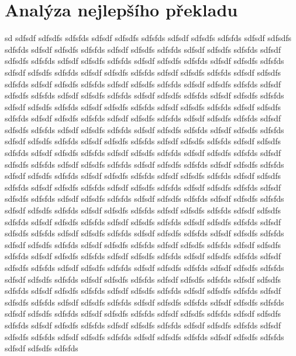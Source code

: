 \documentclass[a4]{article}
\begin{document}
\section{Analýza nejlepšího překladu}

sd sdfsdf sdfsdfs sdfsfds  sdfsdf sdfsdfs sdfsfds  sdfsdf sdfsdfs sdfsfds  sdfsdf sdfsdfs sdfsfds  sdfsdf sdfsdfs sdfsfds  sdfsdf sdfsdfs sdfsfds  sdfsdf sdfsdfs sdfsfds  sdfsdf sdfsdfs sdfsfds  sdfsdf sdfsdfs sdfsfds  sdfsdf sdfsdfs sdfsfds  sdfsdf sdfsdfs sdfsfds  sdfsdf sdfsdfs sdfsfds  sdfsdf sdfsdfs sdfsfds  sdfsdf sdfsdfs sdfsfds  sdfsdf sdfsdfs sdfsfds  sdfsdf sdfsdfs sdfsfds  sdfsdf sdfsdfs sdfsfds  sdfsdf sdfsdfs sdfsfds  sdfsdf sdfsdfs sdfsfds  sdfsdf sdfsdfs sdfsfds  sdfsdf sdfsdfs sdfsfds  sdfsdf sdfsdfs sdfsfds  sdfsdf sdfsdfs sdfsfds  sdfsdf sdfsdfs sdfsfds  sdfsdf sdfsdfs sdfsfds  sdfsdf sdfsdfs sdfsfds  sdfsdf sdfsdfs sdfsfds  sdfsdf sdfsdfs sdfsfds  sdfsdf sdfsdfs sdfsfds  sdfsdf sdfsdfs sdfsfds  sdfsdf sdfsdfs sdfsfds  sdfsdf sdfsdfs sdfsfds  sdfsdf sdfsdfs sdfsfds  sdfsdf sdfsdfs sdfsfds  sdfsdf sdfsdfs sdfsfds  sdfsdf sdfsdfs sdfsfds  sdfsdf sdfsdfs sdfsfds  sdfsdf sdfsdfs sdfsfds  sdfsdf sdfsdfs sdfsfds  sdfsdf sdfsdfs sdfsfds  sdfsdf sdfsdfs sdfsfds  sdfsdf sdfsdfs sdfsfds  sdfsdf sdfsdfs sdfsfds  sdfsdf sdfsdfs sdfsfds  sdfsdf sdfsdfs sdfsfds  sdfsdf sdfsdfs sdfsfds  sdfsdf sdfsdfs sdfsfds  sdfsdf sdfsdfs sdfsfds  sdfsdf sdfsdfs sdfsfds  sdfsdf sdfsdfs sdfsfds  sdfsdf sdfsdfs sdfsfds  sdfsdf sdfsdfs sdfsfds  sdfsdf sdfsdfs sdfsfds  sdfsdf sdfsdfs sdfsfds  sdfsdf sdfsdfs sdfsfds  sdfsdf sdfsdfs sdfsfds  sdfsdf sdfsdfs sdfsfds  sdfsdf sdfsdfs sdfsfds  sdfsdf sdfsdfs sdfsfds  sdfsdf sdfsdfs sdfsfds  sdfsdf sdfsdfs sdfsfds  sdfsdf sdfsdfs sdfsfds  sdfsdf sdfsdfs sdfsfds  sdfsdf sdfsdfs sdfsfds  sdfsdf sdfsdfs sdfsfds  sdfsdf sdfsdfs sdfsfds  sdfsdf sdfsdfs sdfsfds  sdfsdf sdfsdfs sdfsfds  sdfsdf sdfsdfs sdfsfds  sdfsdf sdfsdfs sdfsfds  sdfsdf sdfsdfs sdfsfds  sdfsdf sdfsdfs sdfsfds  sdfsdf sdfsdfs sdfsfds  sdfsdf sdfsdfs sdfsfds  sdfsdf sdfsdfs sdfsfds  sdfsdf sdfsdfs sdfsfds  sdfsdf sdfsdfs sdfsfds  sdfsdf sdfsdfs sdfsfds  sdfsdf sdfsdfs sdfsfds  sdfsdf sdfsdfs sdfsfds  sdfsdf sdfsdfs sdfsfds  sdfsdf sdfsdfs sdfsfds  sdfsdf sdfsdfs sdfsfds  sdfsdf sdfsdfs sdfsfds  sdfsdf sdfsdfs sdfsfds  sdfsdf sdfsdfs sdfsfds  sdfsdf sdfsdfs sdfsfds  sdfsdf sdfsdfs sdfsfds  sdfsdf sdfsdfs sdfsfds  sdfsdf sdfsdfs sdfsfds  sdfsdf sdfsdfs sdfsfds  sdfsdf sdfsdfs sdfsfds  sdfsdf sdfsdfs sdfsfds  sdfsdf sdfsdfs sdfsfds  sdfsdf sdfsdfs sdfsfds  sdfsdf sdfsdfs sdfsfds  sdfsdf sdfsdfs sdfsfds  sdfsdf sdfsdfs sdfsfds  sdfsdf sdfsdfs sdfsfds  sdfsdf sdfsdfs sdfsfds 
\end{document}
